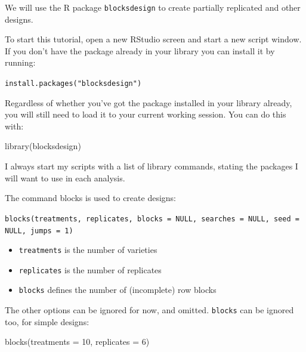 \documentclass[
]{book}
\newenvironment{Shaded}{\begin{snugshade}}{\end{snugshade}}
\newcommand{\AttributeTok}[1]{\textcolor[rgb]{0.77,0.63,0.00}{#1}}
\newcommand{\DecValTok}[1]{\textcolor[rgb]{0.00,0.00,0.81}{#1}}
\newcommand{\FunctionTok}[1]{\textcolor[rgb]{0.00,0.00,0.00}{#1}}
\newcommand{\NormalTok}[1]{#1}
\providecommand{\tightlist}{%
  \setlength{\itemsep}{0pt}\setlength{\parskip}{0pt}}
\begin{document}
We will use the R package \texttt{blocksdesign}\citep{R-blocksdesign} to create partially replicated and other designs.

To start this tutorial, open a new RStudio screen and start a new script window. If you don't have the package already in your library you can install it by running:

\texttt{install.packages("blocksdesign")}

Regardless of whether you've got the package installed in your library already, you will still need to load it to your current working session. You can do this with:

\begin{Shaded}
\begin{Highlighting}[]
\FunctionTok{library}\NormalTok{(blocksdesign)}
\end{Highlighting}
\end{Shaded}

I always start my scripts with a list of library commands, stating the packages I will want to use in each analysis.

The command blocks is used to create designs:

\texttt{blocks(treatments,\ replicates,\ blocks\ =\ NULL,\ searches\ =\ NULL,\ seed\ =\ NULL,\ jumps\ =\ 1)}

\begin{itemize}
\tightlist
\item
  \texttt{treatments} is the number of varieties
\item
  \texttt{replicates} is the number of replicates
\item
  \texttt{blocks} defines the number of (incomplete) row blocks
\end{itemize}

The other options can be ignored for now, and omitted. \texttt{blocks} can be ignored too, for simple designs:

\begin{Shaded}
\begin{Highlighting}[]
\FunctionTok{blocks}\NormalTok{(}\AttributeTok{treatments =} \DecValTok{10}\NormalTok{, }\AttributeTok{replicates =} \DecValTok{6}\NormalTok{)}
\end{Highlighting}
\end{Shaded}
\end{document}
